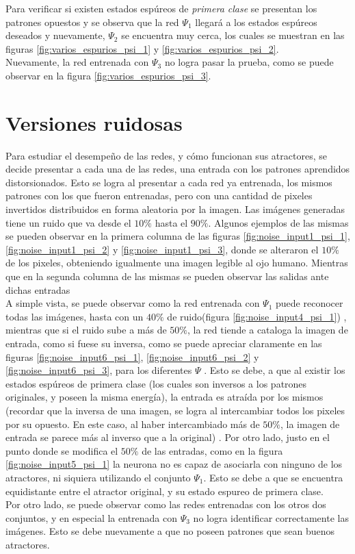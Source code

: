 \documentclass{sig-alternate}
\begin{document}
Para verificar si existen estados espúreos de \textit{primera clase} se presentan los patrones opuestos y se observa que la red  $\Psi_1$ llegará a los estados espúreos deseados y nuevamente, $\Psi_2$ se encuentra muy cerca, los cuales se muestran en las figuras \ref{fig:varios_espurios_psi_1} y \ref{fig:varios_espurios_psi_2}.\\

Nuevamente, la red entrenada con $\Psi_3$ no logra pasar la prueba, como se puede observar en la figura \ref{fig:varios_espurios_psi_3}. \\

\section*{Versiones ruidosas}

Para estudiar el desempeño de las redes, y cómo funcionan sus atractores, se decide presentar a cada una de las redes, una entrada con los patrones aprendidos distorsionados. Esto se logra al presentar a cada red ya entrenada, los mismos patrones con los que fueron entrenadas, pero con una cantidad de pixeles invertidos distribuidos en forma aleatoria por la imagen. Las imágenes generadas tiene un ruido que va desde el $10\%$ hasta el $90\%$. Algunos ejemplos de las mismas se pueden observar en la primera columna de las figuras  \ref{fig:noise_input1_psi_1}, \ref{fig:noise_input1_psi_2} y \ref{fig:noise_input1_psi_3}, donde se alteraron el $10\%$ de los pixeles, obteniendo igualmente una imagen legible al ojo humano.  Mientras que en la segunda columna de las mismas se pueden observar las salidas ante dichas entradas\\
A simple vista, se puede observar como la red entrenada con $\Psi_1$ puede reconocer todas las imágenes, hasta con un $40\%$ de ruido(figura \ref{fig:noise_input4_psi_1}) , mientras que si el ruido sube a más de  $50\%$, la red tiende a cataloga la imagen de entrada, como si fuese su inversa, como se puede apreciar claramente en las figuras \ref{fig:noise_input6_psi_1}, \ref{fig:noise_input6_psi_2} y \ref{fig:noise_input6_psi_3}, para los diferentes $\Psi$ . Esto se debe, a que al existir los estados espúreos de primera clase (los cuales son inversos a los patrones originales, y poseen la misma energía), la entrada es atraída por los mismos (recordar que la inversa de una imagen, se logra al intercambiar todos los pixeles por su opuesto. En este caso, al haber intercambiado más de $50\%$, la imagen de entrada se parece más al inverso que a la original) . Por otro lado, justo en el punto donde se modifica el $50\%$ de las entradas, como en la figura \ref{fig:noise_input5_psi_1} la neurona no es capaz de asociarla con ninguno de los atractores, ni siquiera utilizando el conjunto $\Psi_1$. Esto se debe a que se encuentra equidistante entre el atractor original, y su estado espureo de primera clase.\\
Por otro lado, se puede observar como las redes entrenadas con los otros dos conjuntos, y en especial la entrenada con $\Psi_3$ no logra identificar correctamente las imágenes. Esto se debe nuevamente a que no poseen patrones que sean buenos atractores.\\
\end{document}
